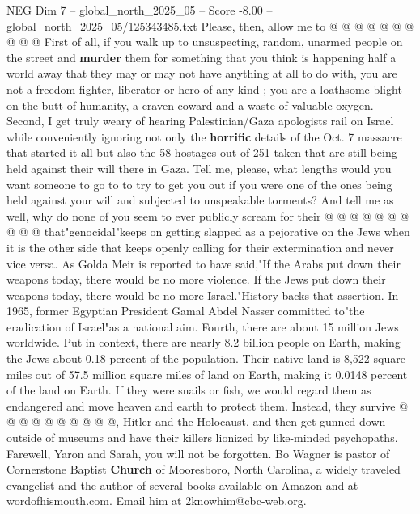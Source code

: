 \begin{textsample}{NEG Dim 7 – global\_north\_2025\_05 – Score -8.00 – global\_north\_2025\_05/125343485.txt}
Please, then, allow me to @ @ @ @ @ @ @ @ @ @ First of all, if you walk up to unsuspecting, random, unarmed people on the street and \textbf{murder} them for something that you think is happening half a world away that they may or may not have anything at all to do with, you are not a freedom fighter, liberator or hero of any kind ; you are a loathsome blight on the butt of humanity, a craven coward and a waste of valuable oxygen.
Second, I get truly weary of hearing Palestinian/Gaza apologists rail on Israel while conveniently ignoring not only the \textbf{horrific} details of the Oct. 7 massacre that started it all but also the 58 hostages out of 251 taken that are still being held against their will there in Gaza.
Tell me, please, what lengths would you want someone to go to to try to get you out if you were one of the ones being held against your will and subjected to unspeakable torments?
And tell me as well, why do none of you seem to ever publicly scream for their @ @ @ @ @ @ @ @ @ @ that"genocidal"keeps on getting slapped as a pejorative on the Jews when it is the other side that keeps openly calling for their extermination and never vice versa.
As Golda Meir is reported to have said,"If the Arabs put down their weapons today, there would be no more violence.
If the Jews put down their weapons today, there would be no more Israel."History backs that assertion.
In 1965, former Egyptian President Gamal Abdel Nasser committed to"the eradication of Israel"as a national aim.
Fourth, there are about 15 million Jews worldwide.
Put in context, there are nearly 8.2 billion people on Earth, making the Jews about 0.18 percent of the population.
Their native land is 8,522 square miles out of 57.5 million square miles of land on Earth, making it 0.0148 percent of the land on Earth.
If they were snails or fish, we would regard them as endangered and move heaven and earth to protect them.
Instead, they survive @ @ @ @ @ @ @ @ @ @, Hitler and the Holocaust, and then get gunned down outside of museums and have their killers lionized by like-minded psychopaths.
Farewell, Yaron and Sarah, you will not be forgotten.
Bo Wagner is pastor of Cornerstone Baptist \textbf{Church} of Mooresboro, North Carolina, a widely traveled evangelist and the author of several books available on Amazon and at wordofhismouth.com.
Email him at 2knowhim@cbc-web.org.

\end{textsample}
